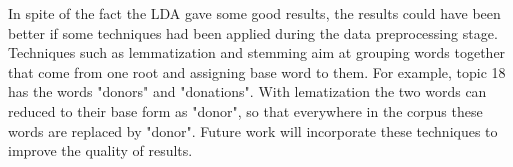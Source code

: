 In spite of the fact the LDA gave some good results, the results could have been better if some techniques had been applied during the data preprocessing stage. Techniques such as lemmatization and stemming aim at grouping words together that come from one root and assigning base word to them. For example, topic 18 has the words "donors" and "donations". With lematization the two words can reduced to their base form as "donor", so that everywhere in the corpus these words are replaced by "donor".  
Future work will incorporate these techniques to improve the quality of results.
%
